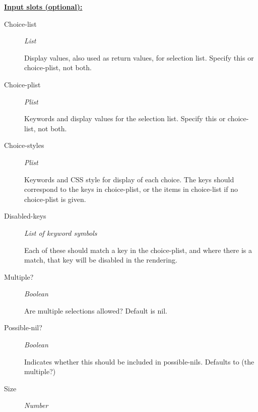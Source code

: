 \documentclass [11pt]{book}
\begin{document}
\begin{itemize}
\begin{figure}
\label{fig:example-code-MENU-FORM-CONTROL}

\end{figure}





\textbf{
\underline{Input slots (optional):}}

\begin{description}

\item [Choice-list]
\emph{List}

 Display values, also used as return values, for selection list. Specify this or choice-plist, not both.




\item [Choice-plist]
\emph{Plist}

 Keywords and display values for the selection list. Specify this or choice-list, not both.




\item [Choice-styles]
\emph{Plist}

 Keywords and CSS style for display of each choice. The keys should correspond to the
keys in choice-plist, or the items in choice-list if no choice-plist is given.




\item [Disabled-keys]
\emph{List of keyword symbols}

 Each of these should match a key in the choice-plist, and where there is a
match, that key will be disabled in the rendering.




\item [Multiple?]
\emph{Boolean}

 Are multiple selections allowed? Default is nil.




\item [Possible-nil?]
\emph{Boolean}

 Indicates whether this should be included in possible-nils. Defaults to (the multiple?)




\item [Size]
\emph{Number}


\end{description}
\end{itemize}
\end{document}
